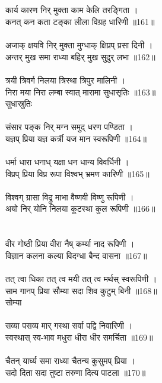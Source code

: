\subsection{}
कार्य कारण निर् मुक्ता काम केलि तरङ्गिता ।\\
कनत् कन कता टङ्का लीला विग्रह धारिणी ॥161॥\\
\\
अजाक् क्षयवि निर् मुक्ता मुग्धाक् क्षिप्रप् प्रसा दिनी ।\\
अन्तर् मुख समा राध्या बहिर् मुख सुदुर् लभा ॥162॥\\
\\
त्रयी त्रिवर्ग निलया त्रिस्था त्रिपुर मालिनी ।\\
निरा मया निरा लम्बा स्वात् मारामा सुधासृतिः ॥163॥ \\
{\small{} सुधास्रुतिः}\\
\\
संसार पङ्क निर् मग्न समुद् धरण पण्डिता ।\\
यज्ञप् प्रिया यज्ञ कर्त्री यज मान स्वरूपिणी ॥164॥\\
\\
धर्मा धारा धनाध् यक्षा धन धान्य विवर्धिनी ।\\
विप्रप् प्रिया विप्र रूपा विश्वभ् भ्रमण कारिणी ॥165॥\\
\\
विश्वग् ग्रासा विद्रु माभा {\small{}} वैष्णवी विष्णु रूपिणी ।\\
अयो निर् योनि निलया कूटस्था कुल रूपिणी ॥166॥\\
\\
\\
वीर गोष्ठी प्रिया वीरा नैष् कर्म्या नाद रूपिणी ।\\
विज्ञान कलना कल्या विदग्धा बैन्द वासना ॥167॥\\
\\
तत् त्वा धिका तत् त्व मयी तत् त्व मर्थस् स्वरूपिणी ।\\
साम गानप् प्रिया सौम्या सदा शिव कुटुम् बिनी ॥168॥ \\
{\small{} सोम्या}\\
\\
सव्या पसव्य मार् गस्था सर्वा पद्वि निवारिणी ।\\
स्वस्थास् स्व-भाव मधुरा धीरा धीर समर्चिता ॥169॥\\
\\
चैतन् यार्घ्य समा राध्या चैतन्य कुसुमप् प्रिया ।\\
सदो दिता सदा तुष्टा तरुणा दित्य पाटला ॥170॥\\
\\

